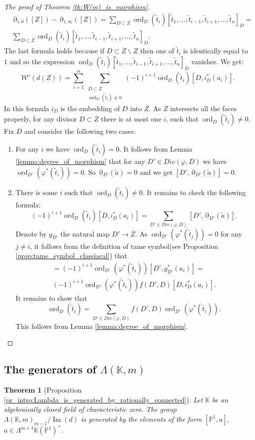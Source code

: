 \documentclass[12pt]{extarticle}
\newtheorem{theorem}{Theorem}[section]
\def\mb{\mathbb}
\def\mc{\mathcal}
\def\L{\Lambda}
\def\k{\mb K}
\def\ph{\varphi}
\def\ol{\overline}
\def\wt{\widetilde}
\renewcommand{\P}{{\mb P}}
\def\bs{\backslash}
\newcommand{\EP}[2]{{\Lambda^{#1}\k(#2)^\times}}
\DeclareMathOperator{\ts}{\partial}
\DeclareMathOperator{\ord}{ord}
\DeclareMathOperator{\im}{Im}
\begin{document}
\begin{proof}[The proof of Theorem \ref{th:W(m)_is_morphism}]
\begin{align*}
    &\ts_{i,0}([Z])-\ts_{i,\infty}([Z])=\sum_{D\subset Z}\ord_D(\wt t_i)[\wt t_1,\dots, \wt t_{i-1},\wt t_{i+1},\dots, \wt t_n]_D=\\
    &\sum_{D\subset \overline Z}\ord_D(\wt t_i)[\wt t_1,\dots, \wt t_{i-1},\wt t_{i+1},\dots, \wt t_n]_D.
\end{align*}
The last formula holds because if $D\subset \ol Z\bs Z$ then one of $\wt t_i$ is identically equal to $1$ and so the expression $\ord_D(\wt t_i)[\wt t_1,\dots, \wt t_{i-1},\wt t_{i+1},\dots, \wt t_n]_D$ vanishes. We get:
    $$\mc W'(d(Z))=\sum\limits_{i=1}^n\sum\limits_{\substack{D\subset \overline Z\\\ord_D(\wt t_i)\ne 0}}(-1)^{i+1}\ord_{D}(\wt t_i)[D,i_D^*(a_i)].$$
    In this formula $i_D$ is the embedding of $D$ into $\overline Z$. As $Z$ intersects all the faces properly, for any divisor $D\subset \overline Z$ there is at most one $i$, such that $\ord_{D}(\wt t_i)\ne 0$. Fix $D$ and consider the following two cases:
    \begin{enumerate}
        \item For any $i$ we have $\ord_{D}(\wt t_i)=0$. It follows from Lemma \ref{lemma:degree_of_morphism} that for any $D'\in Div(\varphi, D)$ we have $\ord_{D'}(\varphi^*(\wt t_i))=0$. So $\ts_{D'}(\wt a)=0$ and we get $[D',\ts_{D'}(\wt a)]=0$.
        \item There is some $i$ such that $\ord_{D}(\wt t_i)\ne 0$. It remains to check the following formula:
            $$(-1)^{i+1}\ord_{D}(\wt t_i)[D,i_D^*(a_i)]=\sum\limits_{D'\in Div(\ph, D)}[D',\ts_{D'}(\wt a)].$$
    Denote by $g_{D'}$ the natural map $D'\to \ol Z$.
    As $\ord_{D'}(\ph^*(\wt t_j))=0$ for any $j\ne i$, it follows from the definition of tame symbol(see Proposition \ref{prop:tame_symbol_classiacal}) that
    \begin{align*}
        [D',\ts_{D'}(\wt a)]=(-1)^{i+1}\ord_{D'}(\ph^*(\wt t_i))[D', g_{D'}^*(a_i)]=\\
        (-1)^{i+1}\ord_{D'}(\ph^*(\wt t_i))f(D',D)[D,i_D^*(a_i)].
    \end{align*}
    It remains to show that
    $$\ord_{D}(\wt t_i)=\sum\limits_{D'\in Div(\ph, D)}f(D',D)\ord_{D'}(\ph^*(\wt t_i)).$$
    This follows from Lemma \ref{lemma:degree_of_morphism}.
    \end{enumerate}
\end{proof}



\subsection{The generators of $\L(\k,m)$}
\begin{theorem}[Proposition \ref{pr_intro:Lambda_is_generated_by_rationally_connected}]
\label{th:Lambda_is_generated_by_rationally_connected}
    Let $\k$ be an algebraically closed field of characteristic zero. The group $\L(\k, m)_{m-1}/\im(d)$ is generated by the elements of the form $[\P^1, a],$  $a\in \EP{m+1}{\P^1}$.
\end{theorem}
\end{document}
